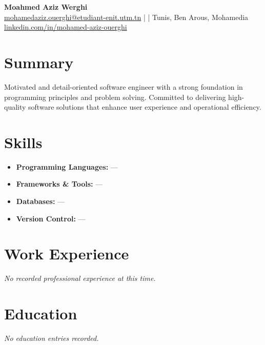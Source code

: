 \documentclass[11pt,a4paper]{article}
\begin{document}

\begin{center}
  {\LARGE \textbf{Moahmed Aziz Werghi}}\\[6pt]
  \href{mailto:mohamedaziz.ouerghi@etudiant-enit.utm.tn}{mohamedaziz.ouerghi@etudiant-enit.utm.tn} \quad |  \quad | \quad Tunis, Ben Arous, Mohamedia\\[4pt]
  \href{https://www.linkedin.com/in/mohamed-aziz-ouerghi/}{linkedin.com/in/mohamed-aziz-ouerghi}
\end{center}

\vspace{6pt}


\section*{Summary}
\noindent
Motivated and detail-oriented software engineer with a strong foundation in programming principles and problem solving. Committed to delivering high-quality software solutions that enhance user experience and operational efficiency.


\section*{Skills}
\begin{itemize}[leftmargin=*,label={}]
  \item \textbf{Programming Languages:} \hspace{0.5em} --- %
  \item \textbf{Frameworks \& Tools:} \hspace{0.5em} ---
  \item \textbf{Databases:} \hspace{0.5em} ---
  \item \textbf{Version Control:} \hspace{0.5em} ---
\end{itemize}


\section*{Work Experience}
\noindent
\textit{No recorded professional experience at this time.}


\section*{Education}
\noindent
\textit{No education entries recorded.}
\end{document}
